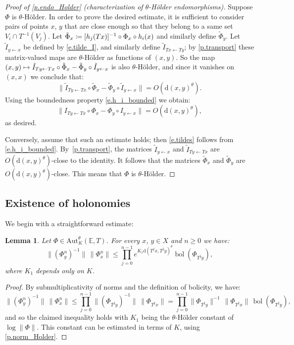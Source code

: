 \documentclass[10pt]{amsart}
\def\vcentcolon{\mathrel{\mathop\ordinarycolon}}
\providecommand\ordinarycolon{:}
\providecommand*\coloneqq{\vcentcolon\mathrel{\mkern-1.2mu}=}
\newcommand\mto{\mathchoice{\longmapsto}{\mapsto}{\mapsto}{\mapsto}}
\theoremstyle{plain}
\newtheorem{lemma}[theorem]{Lemma}
\theoremstyle{definition}
\newcommand{\EE}{\mathbb{E}}
\newcommand{\dd}{\mathrm{d}}
\newcommand{\Aut}{\mathrm{Aut}}
\DeclareMathOperator{\bol}{bol}
\begin{document}
\begin{proof}[Proof of \cref{p.endo_Holder} (characterization of $\theta$-Hölder endomorphisms)]
Suppose $\Phi$ is $\theta$-Hölder.
In order to prove the desired estimate, it is sufficient to consider pairs of points $x$, $y$ that are close enough so that they belong to a same set $V_i \cap T^{-1}(V_j)$. Let $\tilde \Phi_x \coloneqq [h_j(Tx)]^{-1} \circ \Phi_x \circ h_i(x)$ and similarly define $\tilde \Phi_y$.
Let $\tilde I_{y \gets x}$ be defined by \eqref{e.tilde_I}, and similarly define $\tilde I_{Tx \gets Ty}$;
by \cref{p.transport} these matrix-valued maps are $\theta$-Hölder as functions of $(x,y)$.
So the map $(x,y) \mto \tilde I_{Ty \gets Tx} \circ \tilde\Phi_x - \tilde \Phi_y \circ \tilde I_{y \gets x}$
is also $\theta$-Hölder, and since it vanishes on $(x,x)$ we conclude that:
\begin{equation}\label{e.tildes}
\big\| \tilde I_{Ty \gets Tx} \circ \tilde \Phi_x - \tilde \Phi_y \circ \tilde I_{y \gets x} \big\| = O(\dd(x,y)^\theta ).
\end{equation}
Using the boundedness property \eqref{e.h_i_bounded} we obtain:
\[
\big\| I_{Ty \gets Tx} \circ \Phi_x - \Phi_y \circ I_{y \gets x} \big\| = O(\dd(x,y)^\theta),
\]
as desired.

Conversely, assume that such an estimate holds; then \eqref{e.tildes} follows from \eqref{e.h_i_bounded}.
By~\cref{p.transport}, the matrices $\tilde I_{y \gets x}$ and $\tilde I_{Ty \gets Tx}$ are $O(\dd(x,y)^\theta)$-close to the identity.
It follows that the matrices $\tilde \Phi_x$ and $\tilde \Phi_y$ are $O(\dd(x,y)^\theta)$-close.
This means that $\Phi$ is $\theta$-Hölder.
\end{proof}

\subsection{Existence of holonomies}\label{ss.holonomies}

We begin with a straightforward estimate:

\begin{lemma}\label{l.bol}
Let $\Phi \in \Aut^\theta_K(\EE,T)$.
For every $x$, $y \in X$ and $n \ge 0$ we have:
\[
\| (\Phi^n_y)^{-1} \| \, \| \Phi^n_x \| \le \prod_{j=0}^{n-1} e^{K_1 \dd(T^j x, T^j y)^\theta} \bol(\Phi_{T^j y}),
\]
where $K_1$ depends only on $K$.
\end{lemma}

\begin{proof}
By submultiplicativity of norms and the definition of bolicity, we have:
\[
\| (\Phi^n_y)^{-1} \| \, \| \Phi^n_x \|
\le \prod_{j=0}^{n-1} \| (\Phi_{T^j y})^{-1} \| \, \| \Phi_{T^j x} \|
= \prod_{j=0}^{n-1} \| \Phi_{T^j y} \|^{-1} \, \| \Phi_{T^j x} \| \, \bol(\Phi_{T^j y}),
\]
and so the claimed inequality holds with $K_1$ being the $\theta$-Hölder constant of $\log \|\Phi\|$.
This constant can be estimated in terms of $K$, using \eqref{p.norm_Holder}.
\end{proof}
\end{document}
